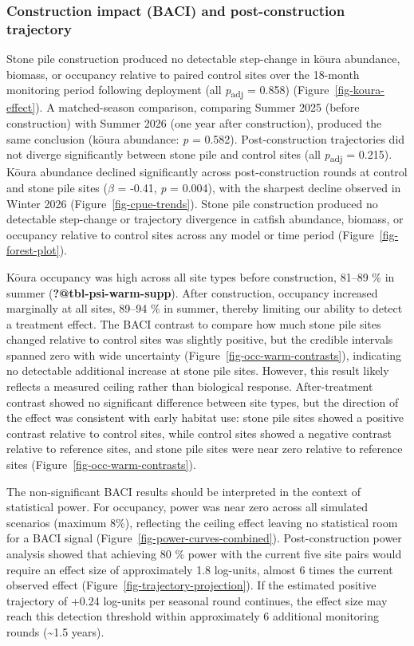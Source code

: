 \documentclass[
  letterpaper,
  DIV=11,
  numbers=noendperiod]{scrartcl}
\begin{document}
\subsubsection{Construction impact (BACI) and post-construction
trajectory}\label{construction-impact-baci-and-post-construction-trajectory}

Stone pile construction produced no detectable step-change in kōura
abundance, biomass, or occupancy relative to paired control sites over
the 18-month monitoring period following deployment (all
\emph{p}\textsubscript{adj} = 0.858) (Figure~\ref{fig-koura-effect}). A
matched-season comparison, comparing Summer 2025 (before construction)
with Summer 2026 (one year after construction), produced the same
conclusion (kōura abundance: \emph{p} = 0.582). Post-construction
trajectories did not diverge significantly between stone pile and
control sites (all \emph{p}\textsubscript{adj} = 0.215). Kōura abundance
declined significantly across post-construction rounds at control and
stone pile sites (\(\beta\) = -0.41, \emph{p} = 0.004), with the
sharpest decline observed in Winter 2026 (Figure~\ref{fig-cpue-trends}).
Stone pile construction produced no detectable step-change or trajectory
divergence in catfish abundance, biomass, or occupancy relative to
control sites across any model or time period
(Figure~\ref{fig-forest-plot}).

Kōura occupancy was high across all site types before construction,
81--89 \% in summer ({\textbf{?@tbl-psi-warm-supp}}). After
construction, occupancy increased marginally at all sites, 89--94 \% in
summer, thereby limiting our ability to detect a treatment effect. The
BACI contrast to compare how much stone pile sites changed relative to
control sites was slightly positive, but the credible intervals spanned
zero with wide uncertainty (Figure~\ref{fig-occ-warm-contrasts}),
indicating no detectable additional increase at stone pile sites.
However, this result likely reflects a measured ceiling rather than
biological response. After-treatment contrast showed no significant
difference between site types, but the direction of the effect was
consistent with early habitat use: stone pile sites showed a positive
contrast relative to control sites, while control sites showed a
negative contrast relative to reference sites, and stone pile sites were
near zero relative to reference sites
(Figure~\ref{fig-occ-warm-contrasts}).

The non-significant BACI results should be interpreted in the context of
statistical power. For occupancy, power was near zero across all
simulated scenarios (maximum 8\%), reflecting the ceiling effect leaving
no statistical room for a BACI signal
({Figure~\ref{fig-power-curves-combined}}). Post-construction power
analysis showed that achieving 80 \% power with the current five site
pairs would require an effect size of approximately 1.8 log-units,
almost 6 times the current observed effect
(Figure~\ref{fig-trajectory-projection}). If the estimated positive
trajectory of +0.24 log-units per seasonal round continues, the effect
size may reach this detection threshold within approximately 6
additional monitoring rounds (\textasciitilde1.5 years).
\end{document}
